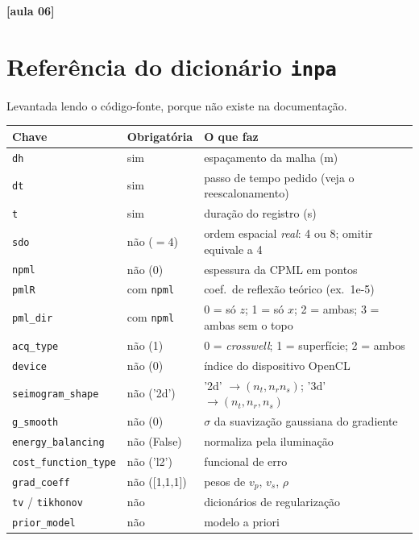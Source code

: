 \documentclass[11pt,a4paper,oneside]{report}
\newcommand{\aula}[1]{\textcolor{cianofwi}{\textbf{[aula #1]}}}
\begin{document}
\aula{06}

\section{Referência do dicionário \texttt{inpa}}

Levantada lendo o código-fonte, porque não existe na documentação.

\begin{center}
\small
\begin{longtable}{@{}llp{8.2cm}@{}}
\toprule
\textbf{Chave} & \textbf{Obrigatória} & \textbf{O que faz} \\
\midrule
\endhead
\texttt{dh} & sim & espaçamento da malha (m) \\
\texttt{dt} & sim & passo de tempo pedido (veja o reescalonamento) \\
\texttt{t} & sim & duração do registro (s) \\
\texttt{sdo} & não ($=4$) & ordem espacial \emph{real}: 4 ou 8; omitir equivale a 4 \\
\texttt{npml} & não (0) & espessura da CPML em pontos \\
\texttt{pmlR} & com \texttt{npml} & coef.\ de reflexão teórico (ex.\ 1e-5) \\
\texttt{pml\_dir} & com \texttt{npml} & 0 = só $z$; 1 = só $x$; 2 = ambas; 3 = ambas sem o topo \\
\texttt{acq\_type} & não (1) & 0 = \emph{crosswell}; 1 = superfície; 2 = ambos \\
\texttt{device} & não (0) & índice do dispositivo OpenCL \\
\texttt{seimogram\_shape} & não ('2d') & '2d' $\to (n_t, n_r n_s)$; '3d' $\to (n_t,n_r,n_s)$ \\
\texttt{g\_smooth} & não (0) & $\sigma$ da suavização gaussiana do gradiente \\
\texttt{energy\_balancing} & não (False) & normaliza pela iluminação \\
\texttt{cost\_function\_type} & não ('l2') & funcional de erro \\
\texttt{grad\_coeff} & não ([1,1,1]) & pesos de $v_p$, $v_s$, $\rho$ \\
\texttt{tv} / \texttt{tikhonov} & não & dicionários de regularização \\
\texttt{prior\_model} & não & modelo a priori \\
\bottomrule
\end{longtable}
\end{center}
\end{document}
